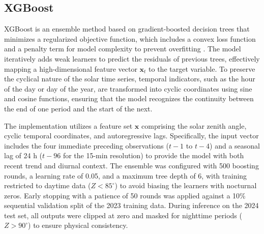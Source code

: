\documentclass[number, 3p, 10pt, times]{elsarticle}
\begin{document}
\subsection{XGBoost}
XGBoost is an ensemble method based on gradient-boosted decision trees that minimizes a regularized objective function, which includes a convex loss function and a penalty term for model complexity to prevent overfitting \citep{Chen2016}. The model iteratively adds weak learners to predict the residuals of previous trees, effectively mapping a high-dimensional feature vector $\mathbf{x}_t$ to the target variable. To preserve the cyclical nature of the solar time series, temporal indicators, such as the hour of the day or day of the year, are transformed into cyclic coordinates using sine and cosine functions, ensuring that the model recognizes the continuity between the end of one period and the start of the next.

The implementation utilizes a feature set $\mathbf{x}$ comprising the solar zenith angle, cyclic temporal coordinates, and autoregressive lags. Specifically, the input vector includes the four immediate preceding observations ($t-1$ to $t-4$) and a seasonal lag of 24 h ($t-96$ for the 15-min resolution) to provide the model with both recent trend and diurnal context. The ensemble was configured with 500 boosting rounds, a learning rate of 0.05, and a maximum tree depth of 6, with training restricted to daytime data ($Z< 85^\circ$) to avoid biasing the learners with nocturnal zeros. Early stopping with a patience of 50 rounds was applied against a 10\% sequential validation split of the 2023 training data. During inference on the 2024 test set, all outputs were clipped at zero and masked for nighttime periods ($Z> 90^\circ$) to ensure physical consistency.
\end{document}
